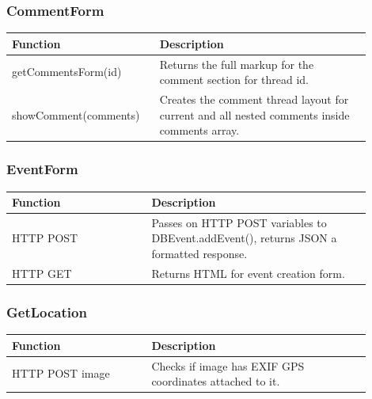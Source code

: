 \subsubsection{CommentForm}
\begin{minipage}{\linewidth}
  \centering
  \setlength{\tabcolsep}{12pt}
  \begin{tabular}{|p{0.35\linewidth}|p{0.55\linewidth}|}
  \hline
  \cellcolor{gray!25} Function & \cellcolor{gray!25} Description \\
  \hline
  getCommentsForm(id) & Returns the full markup for the comment section for thread id. \\
  showComment(comments) & Creates the comment thread layout for current and all nested comments inside comments array. \\
  \hline
  \end{tabular}
\end{minipage}

\subsubsection{EventForm}
\begin{minipage}{\linewidth}
  \centering
  \setlength{\tabcolsep}{12pt}
  \begin{tabular}{|p{0.35\linewidth}|p{0.55\linewidth}|}
  \hline
  \cellcolor{gray!25} Function & \cellcolor{gray!25} Description \\
  \hline
  HTTP POST & Passes on HTTP POST variables to DBEvent.addEvent(), returns JSON a formatted response. \\
  HTTP GET & Returns HTML for event creation form. \\
  \hline
  \end{tabular}
\end{minipage}

\subsubsection{GetLocation}
\begin{minipage}{\linewidth}
  \centering
  \setlength{\tabcolsep}{12pt}
  \begin{tabular}{|p{0.35\linewidth}|p{0.55\linewidth}|}
  \hline
  \cellcolor{gray!25} Function & \cellcolor{gray!25} Description \\
  \hline
  HTTP POST image & Checks if image has EXIF GPS coordinates attached to it. \\
  \hline
  \end{tabular}
\end{minipage}

